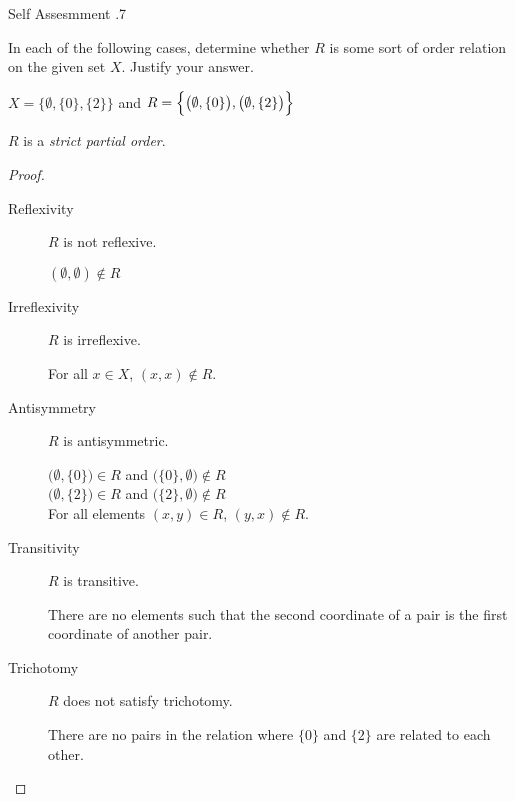 \documentclass[\main/notes.tex]{subfiles}
\begin{document}
\begin{exercise}{Self Assesmment \thechapter.7}
\begin{questions}
\begin{answer}
							\end{answer}
						\item In each of the following cases, determine whether $R$ is some sort of order relation on the given set $X$. Justify your answer.
							\begin{questions}
								\item $X = \bigl\{\emptyset, \{0\}, \{2\}\bigr\}$ and $R = \Bigl\{\bigl(\emptyset, \{0\}\bigr), \bigl(\emptyset, \{2\}\bigr)\Bigr\}$\\
									\begin{answer}
										$R$ is a \emph{strict partial order}.	
										\begin{proof}
											$ $
											\begin{description}
												\item[Reflexivity] $R$ is not reflexive.
													\begin{subproof}[Counterexample]
														$(\emptyset, \emptyset) \notin R$
													\end{subproof}
												\item[Irreflexivity] $R$ is irreflexive.
													\begin{subproof}
														For all $x \in X$, $(x, x) \notin R$.
													\end{subproof}
												\item[Antisymmetry] $R$ is antisymmetric.
													\begin{subproof}
														$\bigl(\emptyset, \{0\}\bigr) \in R$ and $\bigl(\{0\}, \emptyset\bigr) \notin R$\\
														$\bigl(\emptyset, \{2\}\bigr) \in R$ and $\bigl(\{2\}, \emptyset\bigr) \notin R$\\
														For all elements $(x, y) \in R$, $(y, x) \notin R$.
													\end{subproof}
												\item[Transitivity] $R$ is transitive.
													\begin{subproof}
														There are no elements such that the second coordinate of a pair is the first coordinate of another pair.
													\end{subproof}
												\item[Trichotomy] $R$ does not satisfy trichotomy.
													\begin{subproof}[Counterexample]
														There are no pairs in the relation where $\{0\}$ and $\{2\}$ are related to each other.
													\end{subproof}

\end{description}
\end{proof}
\end{answer}
\end{questions}
\end{questions}
\end{exercise}
\end{document}
